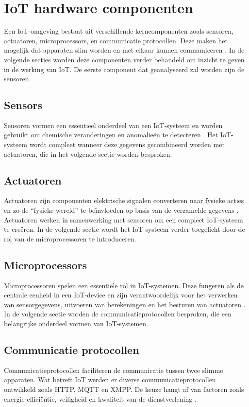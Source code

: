 \section{IoT hardware componenten} 
Een IoT-omgeving bestaat uit verschillende kerncomponenten zoals sensoren, actuatoren, microprocessors, en communicatie protocollen. Deze maken het mogelijk dat apparaten slim worden en met elkaar kunnen communiceren \autocite{Abraham2023, Gharde2024}. In de volgende secties worden deze componenten verder behandeld om inzicht te geven in de werking van IoT. De eerste component dat geanalyseerd zal worden zijn de sensoren.

\subsection{Sensors}
Sensoren vormen een essentieel onderdeel van een IoT-systeem en worden gebruikt om chemische veranderingen en anomalieën te detecteren \autocite{Abraham2023, Moyer2019, Sehrawat2019}. Het IoT-systeem wordt compleet wanneer deze gegevens gecombineerd worden met actuatoren, die in het volgende sectie worden besproken. 

\subsection{Actuatoren}
Actuatoren zijn componenten elektrische signalen converteren naar fysieke acties \autocite{Zhang2022} en zo de “fysieke wereld” te beïnvloeden op basis van de verzamelde gegevens \autocite{Moyer2019}. Actuatoren werken in samenwerking met sensoren om een compleet IoT-systeem te creëren. In de volgende sectie wordt het IoT-systeem verder toegelicht door de rol van de microprocessoren te introduceren.

\subsection{Microprocessors}
Microprocessoren spelen een essentiële rol in IoT-systemen. Deze fungeren als de centrale eenheid in een IoT-device en zijn verantwoordelijk voor het verwerken van sensorgegevens, uitvoeren van berekeningen en het besturen van actuatoren \autocite{Abraham2023, James2021}. In de volgende sectie worden de communicatieprotocollen besproken, die een belangrijke onderdeel vormen van IoT-systemen.

\subsection{Communicatie protocollen}
Communicatieprotocollen faciliteren de communicatie tussen twee slimme apparaten. Wat betreft IoT werden er diverse communicatieprotocollen ontwikkeld zoals HTTP, MQTT en XMPP. De keuze hangt af van factoren zoals energie-efficiëntie, veiligheid en kwaliteit van de dienstverlening \autocite{Anitha2022, Jeddou2020}. 


